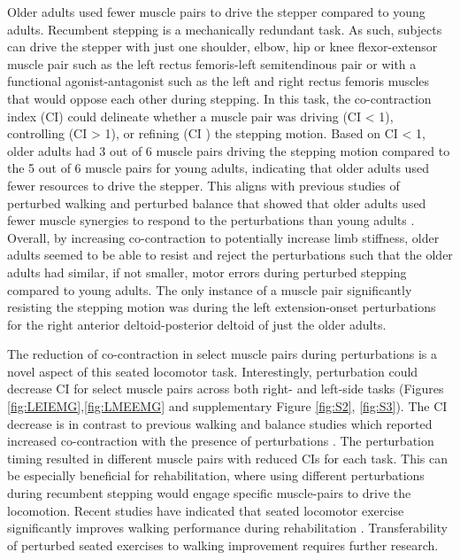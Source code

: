 \documentclass[../thesis_seyed.tex]{subfiles}
\begin{document}
Older adults used fewer muscle pairs to drive the stepper compared to young adults. Recumbent stepping is a mechanically redundant task. As such, subjects can drive the stepper with just one shoulder, elbow, hip or knee flexor-extensor muscle pair such as the left rectus femoris-left semitendinous pair or with a functional agonist-antagonist such as the left and right rectus femoris muscles that would oppose each other during stepping. In this task, the co-contraction index (CI) could delineate whether a muscle pair was driving (CI < 1), controlling (CI > 1), or refining (CI ) the stepping motion. Based on CI < 1, older adults had 3 out of 6 muscle pairs driving the stepping motion compared to the 5 out of 6 muscle pairs for young adults, indicating that older adults used fewer resources to drive the stepper. This aligns with previous studies of perturbed walking and perturbed balance that showed that older adults used  fewer muscle synergies to respond to the perturbations than young adults \cite{Allen2018-kd,Da_Silva_Costa2020-vl}. Overall, by increasing co-contraction to potentially increase limb stiffness, older adults seemed to be able to resist and reject the perturbations such that the older adults had similar, if not smaller, motor errors during perturbed stepping compared to young adults. The only instance of a muscle pair significantly resisting the stepping motion was during the left extension-onset perturbations for the right anterior deltoid-posterior deltoid of just the older adults.

The reduction of co-contraction in select muscle pairs during perturbations is a novel aspect of this seated locomotor task. Interestingly, perturbation could decrease CI for select muscle pairs across both right- and left-side tasks (Figures \ref{fig:LEIEMG},\ref{fig:LMEEMG} and supplementary Figure \ref{fig:S2}, \ref{fig:S3}). The CI decrease is in contrast to previous walking and balance studies which reported increased co-contraction with the presence of perturbations \cite{Tang1998-jp,Nagai2012-kp,Richards2019-tz}. The perturbation timing resulted in different muscle pairs with reduced CIs for each task. This can be especially beneficial for rehabilitation, where using different perturbations during recumbent stepping would engage specific muscle-pairs to drive the locomotion. Recent studies have indicated that seated locomotor exercise significantly improves walking performance during rehabilitation \cite{Kaupp2018-ch,Zhou2018-yy}. Transferability of perturbed seated exercises to walking improvement requires further research.
\end{document}
